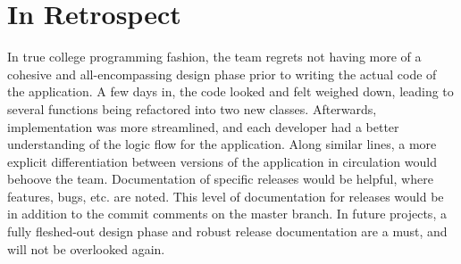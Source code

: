 \documentclass[12pt]{report}
\begin{document}
\section*{In Retrospect}
In true college programming fashion, the team regrets not having more of a cohesive and all-encompassing design phase prior to writing the actual code of the application. A few days in, the code looked and felt weighed down, leading to several functions being refactored into two new classes. Afterwards, implementation was more streamlined, and each developer had a better understanding of the logic flow for the application. Along similar lines, a more explicit differentiation between versions of the application in circulation would behoove the team. Documentation of specific releases would be helpful, where features, bugs, etc. are noted. This level of documentation for releases would be in addition to the commit comments on the master branch. In future projects, a fully fleshed-out design phase and robust release documentation are a must, and will not be overlooked again.
\end{document}
